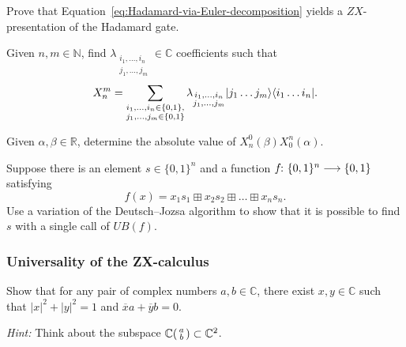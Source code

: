 \documentclass[a4paper, oneside, 12pt]{amsart}
\begin{document}
\begin{exercise}
  Prove that Equation~\eqref{eq:Hadamard-via-Euler-decomposition} yields a \(ZX\)-presentation of the Hadamard gate.
\end{exercise}

\begin{exercise}
  Given \(n,m \in \mathbb{N}\), find \(\lambda_{\substack{i_{1}, \dots , i_{n}\\ j_{1}, \dots , j_{m}}} \in \mathbb{C}\) coefficients such that
  \begin{equation*}
    X_{n}^{m} = \sum_{\substack{i_{1}, \dots , i_{n} \in\{0,1\},\\ j_{1}, \dots , j_{m} \in\{0,1\}}} \lambda_{\substack{i_{1}, \dots , i_{n}\\ j_{1}, \dots , j_{m}}} \lvert j_{1} \dots j_{m}\rangle\langle i_{1} \dots i_{n}\rvert.
  \end{equation*}
\end{exercise}

\begin{exercise}
  Given \(\alpha, \beta \in \mathbb{R}\), determine the absolute value of \(X_{n}^{0}(\beta)X_{0}^{n}(\alpha)\).
\end{exercise}

\begin{exercise}
  Suppose there is an element \(s \in\{0,1\}^{n}\) and a function \(f \from\{0, 1\}^{n} \to\{0,1\}\) satisfying
  \begin{equation*}
    f(x) = x_{1}s_{1} \boxplus x_{2}s_{2} \boxplus \dots \boxplus x_{n} s_{n}.
  \end{equation*}
  Use a variation of the Deutsch--Jozsa algorithm to show that it is possible to find \(s\) with a single call of \(UB(f)\).
\end{exercise}

\subsubsection*{Universality of the ZX-calculus}

\begin{exercise}\label{exe:existence-of-rotation}
  Show that for any pair of complex numbers \(a, b \in \mathbb{C}\), there exist \(x,y \in \mathbb{C}\) such that \(|x|^{2} +|y|^{2}=1 \) and  \(\overline{x}a + \overline{y}b = 0\).

  \textit{Hint:} Think about the subspace \(
  \mathbb{C}
  \begin{psmallmatrix}
    a \\b
  \end{psmallmatrix} \subset \mathbb{C}^{2}
  \).
\end{exercise}
\end{document}
